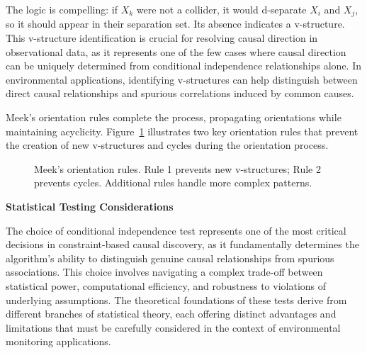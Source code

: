 The logic is compelling: if $X_k$ were not a collider, it would d-separate $X_i$ and $X_j$, so it should appear in their separation set. Its absence indicates a v-structure. This v-structure identification is crucial for resolving causal direction in observational data, as it represents one of the few cases where causal direction can be uniquely determined from conditional independence relationships alone. In environmental applications, identifying v-structures can help distinguish between direct causal relationships and spurious correlations induced by common causes.

Meek's orientation rules complete the process, propagating orientations while maintaining acyclicity. Figure~\ref{fig:meek_rules} illustrates two key orientation rules that prevent the creation of new v-structures and cycles during the orientation process.

\begin{figure}[H]
	\centering
	\caption[Meek's orientation rules]{Meek's orientation rules. Rule 1 prevents new v-structures; Rule 2 prevents cycles. Additional rules handle more complex patterns.}
	\label{fig:meek_rules}
\end{figure}

\textbf{Statistical Testing Considerations}

The choice of conditional independence test represents one of the most critical decisions in constraint-based causal discovery, as it fundamentally determines the algorithm's ability to distinguish genuine causal relationships from spurious associations. This choice involves navigating a complex trade-off between statistical power, computational efficiency, and robustness to violations of underlying assumptions. The theoretical foundations of these tests derive from different branches of statistical theory, each offering distinct advantages and limitations that must be carefully considered in the context of environmental monitoring applications.


